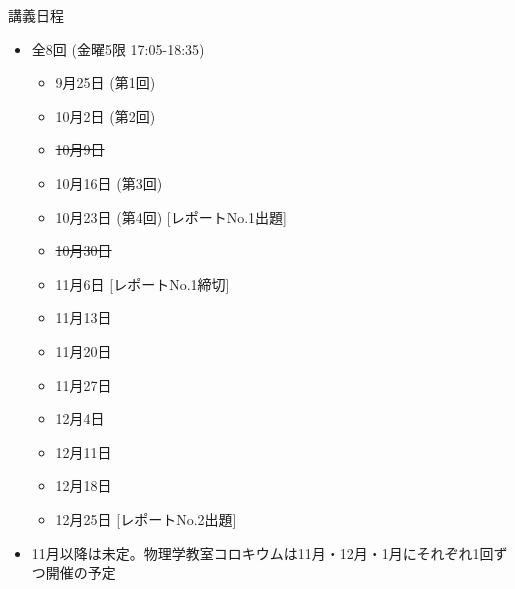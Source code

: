 \begin{frame}[t]{講義日程}
  \begin{itemize}
  \item 全8回 (金曜5限 {\color{red}17:05}-18:35)
    \begin{itemize}
    \item 9月25日 (第1回)
    \item 10月2日 (第2回)
    \item \sout{10月9日}
    \item 10月16日 (第3回)
    \item 10月23日 (第4回) [レポートNo.1出題]
    \item \sout{10月30日}
    \item {\color{gray} 11月6日} [レポートNo.1締切]
    \item {\color{gray} 11月13日}
    \item {\color{gray} 11月20日}
    \item {\color{gray} 11月27日}
    \item {\color{gray} 12月4日}
    \item {\color{gray} 12月11日}
    \item {\color{gray} 12月18日}
    \item {\color{gray} 12月25日} [レポートNo.2出題]
    \end{itemize}
  \item 11月以降は未定。物理学教室コロキウムは11月・12月・1月にそれぞれ1回ずつ開催の予定
  \end{itemize}
\end{frame}
